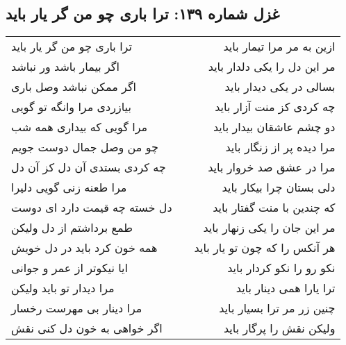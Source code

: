 \begin{center}
\section*{غزل شماره ۱۳۹: ترا باری چو من گر یار باید}
\label{sec:139}
\begin{longtable}{l p{0.5cm} r}
ترا باری چو من گر یار باید
&&
ازین به مر مرا تیمار باید
\\
اگر بیمار باشد ور نباشد
&&
مر این دل را یکی دلدار باید
\\
اگر ممکن نباشد وصل باری
&&
بسالی در یکی دیدار باید
\\
بیازردی مرا وانگه تو گویی
&&
چه کردی کز منت آزار باید
\\
مرا گویی که بیداری همه شب
&&
دو چشم عاشقان بیدار باید
\\
چو من وصل جمال دوست جویم
&&
مرا دیده پر از زنگار باید
\\
چه کردی بستدی آن دل کز آن دل
&&
مرا در عشق صد خروار باید
\\
مرا طعنه زنی گویی دلیرا
&&
دلی بستان چرا بیکار باید
\\
دل خسته چه قیمت دارد ای دوست
&&
که چندین با منت گفتار باید
\\
طمع برداشتم از دل ولیکن
&&
مر این جان را یکی زنهار باید
\\
همه خون کرد باید در دل خویش
&&
هر آنکس را که چون تو یار باید
\\
ایا نیکوتر از عمر و جوانی
&&
نکو رو را نکو کردار باید
\\
مرا دیدار تو باید ولیکن
&&
ترا یارا همی دینار باید
\\
مرا دینار بی مهرست رخسار
&&
چنین زر مر ترا بسیار باید
\\
اگر خواهی به خون دل کنی نقش
&&
ولیکن نقش را پرگار باید
\\
\end{longtable}
\end{center}
